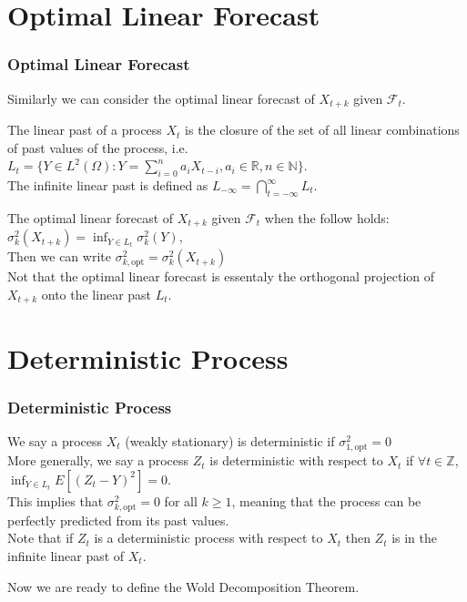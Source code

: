 \documentclass{beamer}
\newcommand{\R}{\mathbb{R}}
\newcommand{\Z}{\mathbb{Z}}
\begin{document}
\section{Optimal Linear Forecast}
\begin{frame}
    \frametitle{Optimal Linear Forecast}
    Similarly we can consider the optimal linear forecast of $X_{t+k}$ given $\mathcal{F}_t$.\\
    \begin{definition}
        The linear past of a process $X_t$ is the closure of the set of all linear combinations of past values of the process, i.e.
        $L_t = \{Y \in L^2(\Omega) : Y = \sum_{i=0}^{n} a_i X_{t-i}, a_i \in \R, n \in \mathbb{N}\}$.\\
        The infinite linear past is defined as $L_{-\infty} = \bigcap_{t=-\infty}^{\infty} L_t$.
    \end{definition}
    \begin{definition}
        The optimal linear forecast of $X_{t+k}$ given $\mathcal{F}_t$ when the follow holds: $\sigma^2_k(X_{t+k}) = \inf_{Y \in L_t} \sigma^2_k(Y)$,\\
        Then we can write $\sigma^2_{k,\text{opt}} = \sigma^2_k(X_{t+k})$\\
        Not that the optimal linear forecast is essentaly the orthogonal projection of $X_{t+k}$ onto the linear past $L_t$.
    \end{definition}
\end{frame}

\section{Deterministic Process}
\begin{frame}
    \frametitle{Deterministic Process}
        \begin{definition}[Deterministic]
            We say a process $X_t$ (weakly stationary) is deterministic if $\sigma^2_{1, \text{opt}} = 0$ \\
            More generally, we say a process $Z_t$ is deterministic with respect to $X_t$ if $\forall t \in \Z$, $\inf_{Y \in L_t} E[(Z_t - Y)^2] = 0$.\\
            This implies that $\sigma^2_{k, \text{opt}} = 0$ for all $k \geq 1$, meaning that the process can be perfectly predicted from its past values.\\
            Note that if $Z_t$ is a deterministic process with respect to $X_t$ then $Z_t$ is in the infinite linear past of $X_t$.
        \end{definition}
        Now we are ready to define the Wold Decomposition Theorem.
\end{frame}
\end{document}
